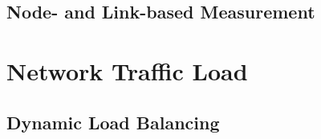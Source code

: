 \documentclass[11pt]{article}
\begin{document}
\subsection{Node- and Link-based Measurement}

\section{Network Traffic Load}

\subsection{Dynamic Load Balancing}




\end{document}
